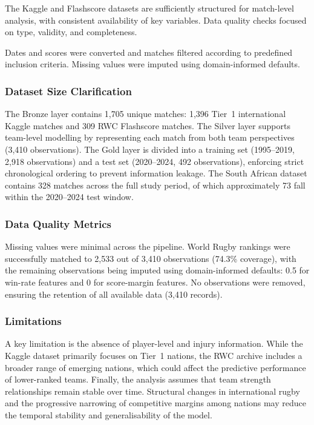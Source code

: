 \documentclass[12pt,a4paper,onecolumn]{article}
\begin{document}
The Kaggle and Flashscore datasets are sufficiently structured for match-level analysis, with consistent availability of key variables. Data quality checks focused on type, validity, and completeness.

Dates and scores were converted and matches filtered according to predefined inclusion criteria. Missing values were imputed using domain-informed defaults.

\subsubsection{Dataset Size Clarification}

The Bronze layer contains 1,705 unique matches: 1,396 Tier~1 international Kaggle matches and 309 RWC Flashscore matches. The Silver layer supports team-level modelling by representing each match from both team perspectives (3,410 observations). The Gold layer is divided into a training set (1995--2019, 2,918 observations) and a test set (2020--2024, 492 observations), enforcing strict chronological ordering to prevent information leakage. \cite{Bergmeir2012} The South African dataset contains 328 matches across the full study period, of which approximately 73 fall within the 2020--2024 test window.

\subsubsection{Data Quality Metrics}

Missing values were minimal across the pipeline. World Rugby rankings were successfully matched to 2,533 out of 3,410 observations (74.3\% coverage), with the remaining observations being imputed using domain-informed defaults: 0.5 for win-rate features and 0 for score-margin features. No observations were removed, ensuring the retention of all available data (3,410 records).

\subsubsection{Limitations}

A key limitation is the absence of player-level and injury information. \cite{Williams2016,Hurley2016} While the Kaggle dataset primarily focuses on Tier~1 nations, the RWC archive includes a broader range of emerging nations, which could affect the predictive performance of lower-ranked teams. \cite{Bunker2022} Finally, the analysis assumes that team strength relationships remain stable over time. Structural changes in international rugby and the progressive narrowing of competitive margins among nations may reduce the temporal stability and generalisability of the model. \cite{Bergmeir2012}
\end{document}
